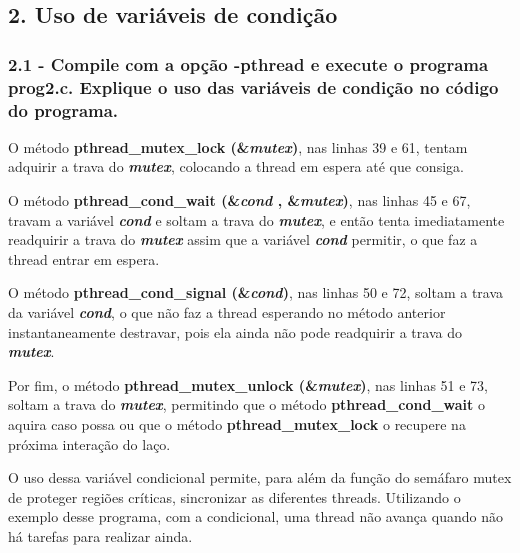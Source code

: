 \subsection*{2. Uso de variáveis de condição}

\subsubsection{2.1 - Compile com a opção -pthread e execute o programa prog2.c. Explique o uso das variáveis de condição no código do programa.}

\vspace{-0.5em}
\begin{minipage}{\textwidth}
  \hspace{-1em}
  \centering
  
  \label{prog4mod}
  \hspace{1em}
\end{minipage}
\vspace{0.5em}

O método \textbf{pthread{\_}mutex{\_}lock (\&\textit{mutex})}, nas linhas 39 e 61, tentam adquirir a trava do \textit{\textbf{mutex}}, colocando a thread em espera até que consiga.

O método \textbf{pthread{\_}cond{\_}wait (\&\textit{cond} , \&\textit{mutex})}, nas linhas 45 e 67, travam a variável \textit{\textbf{cond}} e soltam a trava do \textit{\textbf{mutex}}, e então tenta imediatamente readquirir a trava do \textit{\textbf{mutex}} assim que a variável \textit{\textbf{cond}} permitir, o que faz a thread entrar em espera.

O método \textbf{pthread{\_}cond{\_}signal (\&\textit{cond})}, nas linhas 50 e 72, soltam a trava da variável \textit{\textbf{cond}}, o que não faz a thread esperando no método anterior instantaneamente destravar, pois ela ainda não pode readquirir a trava do \textit{\textbf{mutex}}.

Por fim, o método \textbf{pthread{\_}mutex{\_}unlock (\&\textit{mutex})}, nas linhas 51 e 73, soltam a trava do \textit{\textbf{mutex}}, permitindo que o método \textbf{pthread{\_}cond{\_}wait} o aquira caso possa ou que o método \textbf{pthread{\_}mutex{\_}lock} o recupere na próxima interação do laço.

O uso dessa variável condicional permite, para além da função do semáfaro mutex de proteger regiões críticas, sincronizar as diferentes threads. Utilizando o exemplo desse programa, com a condicional, uma thread não avança quando não há tarefas para realizar ainda.


